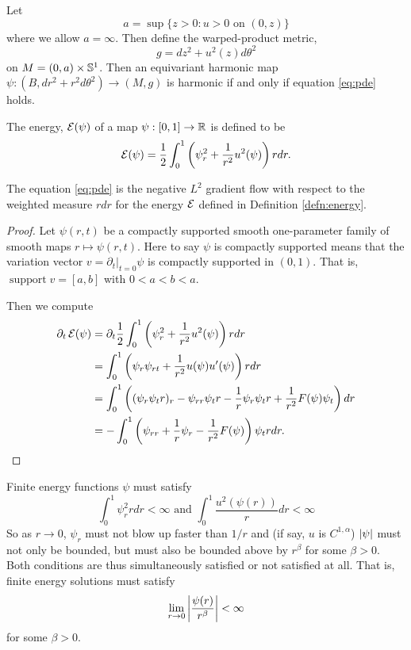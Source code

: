 \documentclass{amsart}
\begin{document}
Let
\[
a = \sup\{z > 0: u > 0 \text{ on } (0, z)\}
\]
where we allow \(a = \infty\). Then define the warped-product metric,
\[
g = dz^2 + u^2(z) d\theta^2
\]
on \(M = (0, a) \times \S^1\). Then an equivariant harmonic map \(\psi: (B, dr^2 + r^2 d\theta^2) \to (M, g)\) is harmonic if and only if equation \eqref{eq:pde} holds.

\begin{defn}
\label{defn:energy}
The energy, \(\E(\psi)\) of a map \(\psi: [0, 1] \to \R\) is defined to be
\[
\E(\psi) = \frac{1}{2} \int_0^1 \left(\psi_r^2 + \frac{1}{r^2} u^2(\psi)\right) r dr.
\]
\end{defn}

\begin{lemma}
The equation \eqref{eq:pde} is the negative \(L^2\) gradient flow with respect to the weighted measure \(r dr\) for the energy \(\E\) defined in Definition \ref{defn:energy}.
\end{lemma}

\begin{proof}
Let \(\psi(r, t)\) be a compactly supported smooth one-parameter family of smooth maps \(r \mapsto \psi(r, t)\). Here to say \(\psi\) is compactly supported means that the variation vector \(v = \partial_t|_{t=0} \psi\) is compactly supported in \((0, 1)\). That is, \(\operatorname{support} v = [a, b]\) with \(0 < a < b < a\).

Then we compute
\[
\begin{split}
\partial_t \E(\psi) &= \partial_t \frac{1}{2} \int_0^1  \left(\psi_r^2 + \frac{1}{r^2} u^2(\psi)\right) r dr \\
&= \int_0^1  \left(\psi_r \psi_{rt} + \frac{1}{r^2} u(\psi)u'(\psi)\right) r dr \\
&= \int_0^1 \left((\psi_r \psi_t r)_r - \psi_{rr} \psi_t r - \frac{1}{r} \psi_r \psi_t r + \frac{1}{r^2} F(\psi) \psi_t\right) dr \\
&= - \int_0^1 \left(\psi_{rr} + \frac{1}{r} \psi_r - \frac{1}{r^2} F(\psi)\right) \psi_t r dr.
\end{split}
\]
\end{proof}

\begin{rem}
\label{rem:finite_energy}

Finite energy functions \(\psi\) must satisfy
\[
\int_0^1 \psi_r^2 r dr < \infty \text{ and } \int_0^1 \frac{u^2(\psi(r))}{r} dr < \infty
\]
So as \(r\to 0\), \(\psi_r\) must not blow up faster than \(1/r\) and (if say, \(u\) is \(C^{1,\alpha}\)) \(\abs{\psi}\) must not only be bounded, but must also be bounded above by \(r^{\beta}\) for some \(\beta > 0\). Both conditions are thus simultaneously satisfied or not satisfied at all. That is, finite energy solutions must satisfy
\[
\lim_{r \to 0} \abs{\frac{\psi(r)}{r^{\beta}}} < \infty
\]
for some \(\beta > 0\).
\end{rem}
\end{document}
